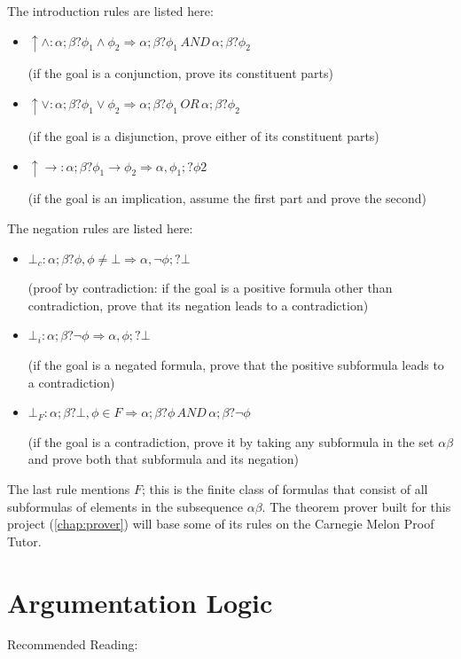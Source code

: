 \documentclass[11pt,twoside,a4paper]{report}
\begin{document}
The introduction rules are listed here:
\begin{itemize}
\item
$\uparrow\wedge: \alpha;\beta?\phi_1\wedge\phi_2 \Rightarrow \alpha;\beta?\phi_1\, AND\, \alpha;\beta?\phi_2$

(if the goal is a conjunction, prove its constituent parts)
\item
$\uparrow\vee: \alpha;\beta?\phi_1\vee\phi_2 \Rightarrow \alpha;\beta?\phi_1\, OR\, \alpha;\beta?\phi_2$

(if the goal is a disjunction, prove either of its constituent parts)
\item
$\uparrow\rightarrow: \alpha;\beta?\phi_1\rightarrow\phi_2 \Rightarrow \alpha,\phi_1;?\phi2$

(if the goal is an implication, assume the first part and prove the second)
\end{itemize}

The negation rules are listed here:
\begin{itemize}
\item
$\bot_c: \alpha;\beta?\phi, \phi\neq\bot \Rightarrow \alpha,\neg\phi;?\bot$

(proof by contradiction: if the goal is a positive formula other than contradiction, prove that its negation leads to a contradiction)
\item
$\bot_i: \alpha;\beta?\neg\phi \Rightarrow \alpha,\phi;?\bot$

(if the goal is a negated formula, prove that the positive subformula leads to a contradiction)
\item
$\bot_F: \alpha;\beta?\bot, \phi\in F \Rightarrow \alpha;\beta?\phi\, AND\, \alpha;\beta?\neg\phi$

(if the goal is a contradiction, prove it by taking any subformula in the set $\alpha\beta$ and prove both that subformula and its negation)
\end{itemize}

The last rule mentions $F$; this is the finite class of formulas that consist of all subformulas of elements in the subsequence $\alpha\beta$. The theorem prover built for this project (\autoref{chap:prover}) will base some of its rules on the Carnegie Melon Proof Tutor.

\section{Argumentation Logic}
Recommended Reading: \citep*{alpaper}
\end{document}
